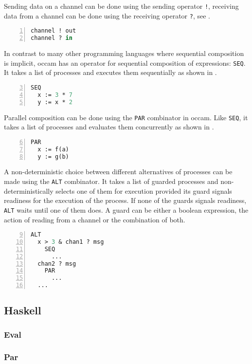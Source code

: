 Sending data on a channel can be done using the sending operator \texttt{!}, receiving data from a channel can be done using the receiving operator \texttt{?}, see .

\begin{lstlisting}[language=Caml, caption=Sending data over a channel and receiving data from a channel in \textsf{occam}., label=lst:occam_send_receive, numbers=left, frame=bt]
channel ! out
channel ? in
\end{lstlisting}

In contrast to many other programming languages where sequential composition is implicit, \textsf{occam} has an operator for sequential composition of expressions: \texttt{SEQ}. It takes a list of processes and executes them sequentially as shown in .

\begin{lstlisting}[language=Caml, caption=Sequential composition of processes in \textsf{occam}., label=lst:occam_seq, numbers=left, frame=bt, firstnumber=3]
SEQ
  x := 3 * 7
  y := x * 2
\end{lstlisting}

Parallel composition can be done using the \texttt{PAR} combinator in \textsf{occam}. Like \texttt{SEQ}, it takes a list of processes and evaluates them concurrently as shown in .

\begin{lstlisting}[language=Caml, caption=Parallel composition of processes in \textsf{occam}., label=lst:occam_par, numbers=left, frame=bt, firstnumber=6]
PAR
  x := f(a)
  y := g(b)
\end{lstlisting}

A non-deterministic choice between different alternatives of processes can be made using the \texttt{ALT} combinator. It takes a list of guarded processes and non-deterministically selects one of them for execution provided its guard signals readiness for the execution of the process. If none of the guards signals readiness, \texttt{ALT} waits until one of them does. A guard can be either a boolean expression, the action of reading from a channel or the combination of both.

\begin{lstlisting}[language=Caml, caption=Choice between process alternatives in \textsf{occam}., label=lst:occam_par, numbers=left, frame=bt, firstnumber=9]
ALT
  x > 3 & chan1 ? msg
    SEQ
      ...
  chan2 ? msg
    PAR
      ...
  ...
\end{lstlisting}

\subsection{Haskell}

\subsubsection{Eval}

\subsubsection{Par}